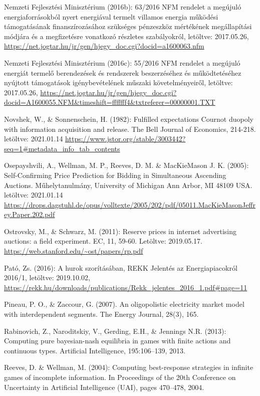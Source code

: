 \documentclass[twoside, magyar, showtrims]{corvinusphd}
\begin{document}
\begin{thebibliography}{99}
Nemzeti Fejlesztési Minisztérium (2016b): 63/2016 NFM rendelet a megújuló energiaforrásokból nyert energiával termelt villamos energia működési támogatásának finanszírozásához szükséges pénzeszköz mértékének megállapítási módjára és a megfizetésre vonatkozó részletes szabályokról, letöltve: 2017.05.26,
\url{https://net.jogtar.hu/jr/gen/hjegy\_doc.cgi?docid=a1600063.nfm}

Nemzeti Fejlesztési Minisztérium (2016c): 55/2016 NFM rendelet a megújuló energiát termelő berendezések és rendszerek beszerzéséhez és működtetéséhez nyújtott támogatások igénybevételének műszaki követelményeiről, letöltve: 2017.05.26,
\url{https://net.jogtar.hu/jr/gen/hjegy\_doc.cgi?docid=A1600055.NFM\&timeshift=fffffff4\&txtreferer=00000001.TXT}

Novshek, W., \& Sonnenschein, H. (1982): Fulfilled expectations Cournot duopoly with information acquisition and release. The Bell Journal of Economics, 214-218. letöltve: 2021.01.14
\url{https://www.jstor.org/stable/3003442?seq=1\#metadata\_info\_tab\_contents}

Osepayshvili, A., Wellman, M. P., Reeves, D. M. \&  MacKieMason J. K. (2005):  Self-Confirming Price Prediction for Bidding in Simultaneous Ascending Auctions. Műhelytanulmány, University of Michigan Ann Arbor, MI 48109 USA. letöltve: 2021.01.14
\url{https://drops.dagstuhl.de/opus/volltexte/2005/202/pdf/05011.MacKieMasonJeffrey.Paper.202.pdf}

Ostrovsky, M., \& Schwarz, M. (2011): Reserve prices in internet advertising auctions: a field experiment. EC, 11, 59-60. Letöltve: 2019.05.17.
\url{https://web.stanford.edu/~ost/papers/rp.pdf}

Pató, Zs. (2016): A hurok szorításában, REKK Jelentés az Energiapiacokról 2016/1, letöltve: 2019.10.02,
\url{https://rekk.hu/downloads/publications/Rekk\_jelentes\_2016\_1.pdf\#page=11}

Pineau, P. O., \& Zaccour, G. (2007). An oligopolistic electricity market model with interdependent segments. The Energy Journal, 28(3), 165.

Rabinovich, Z., Naroditskiy, V., Gerding, E.H., \& Jennings N.R. (2013): Computing pure bayesian-nash equilibria in games with finite actions and continuous types. Artificial Intelligence, 195:106–139, 2013.

Reeves, D. \& Wellman, M. (2004): Computing best-response strategies in infinite games of incomplete information. In Proceedings of the 20th Conference on Uncertainty in Artificial Intelligence
(UAI), pages 470–478, 2004.


\end{thebibliography}
\end{document}

